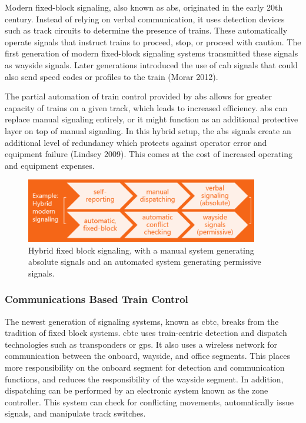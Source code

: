 \documentclass[11pt, titlepage]{article}
\begin{document}
Modern fixed-block signaling, also known as \gls{abs}, originated in the early 20th
century. Instead of relying on verbal communication, it uses detection devices such
as track circuits to determine the presence of trains. These automatically operate
signals that instruct trains to proceed, stop, or proceed with caution. The first
generation of modern fixed-block signaling systems transmitted these signals as
wayside signals. Later generations introduced the use of cab signals that could
also send speed codes or profiles to the train (Morar 2012).

The partial automation of train control provided by \gls{abs} allows for greater
capacity of trains on a given track, which leads to increased efficiency. \gls{abs}
can replace manual signaling entirely, or it might function as an additional
protective layer on top of manual signaling. In this hybrid setup, the \gls{abs}
signals create an additional level of redundancy which protects against operator
error and equipment failure (Lindsey 2009). This comes at the cost of increased
operating and equipment expenses.

\begin{figure}[ht]
    \begin{center}
        \includegraphics[width=4in]{HybridSignaling.png}
        \captionsetup{justification=centering}
        \caption[Hybrid fixed-block signaling]{Hybrid fixed block signaling, with
        a manual system generating absolute signals and an automated system generating
        permissive signals.}
    \end{center}
\end{figure}

\subsubsection{Communications Based Train Control}

The newest generation of signaling systems, known as \gls{cbtc}, breaks from the
tradition of fixed block systems. \gls{cbtc} uses train-centric detection and
dispatch technologies such as transponders or \gls{gps}. It also uses a wireless
network for communication between the onboard, wayside, and office segments. This
places more responsibility on the onboard segment for detection and communication
functions, and reduces the responsibility of the wayside segment. In addition,
dispatching can be performed by an electronic system known as the zone controller.
This system can check for conflicting movements, automatically issue signals, and
manipulate track switches.
\end{document}
